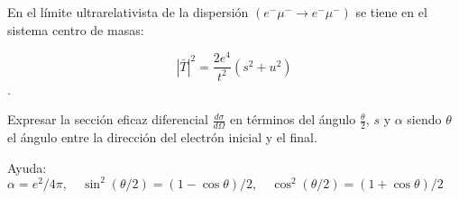 En el límite ultrarelativista de la dispersión $\left(e^{-} \mu^{-} \rightarrow e^{-} \mu^{-}\right)$ se tiene en el sistema centro de masas: 

$$
|\bar{T}|^{2} =\frac{2 e^{4}}{t^{2}}\left(s^{2}+u^{2}\right)
$$.

Expresar la sección eficaz diferencial $\frac{d\sigma}{d \Omega}$ en términos del ángulo $\frac{\theta}{2}$, $s$ y $\alpha$ siendo $\theta$ el ángulo entre la dirección del electrón inicial y el final.  

Ayuda: $\alpha=e^{2} / 4 \pi, \quad \sin ^{2}(\theta / 2)=(1-\cos \theta) / 2, \quad \cos ^{2}(\theta / 2)=(1+\cos \theta) / 2$

\begin{solution}\ \\

\end{solution}